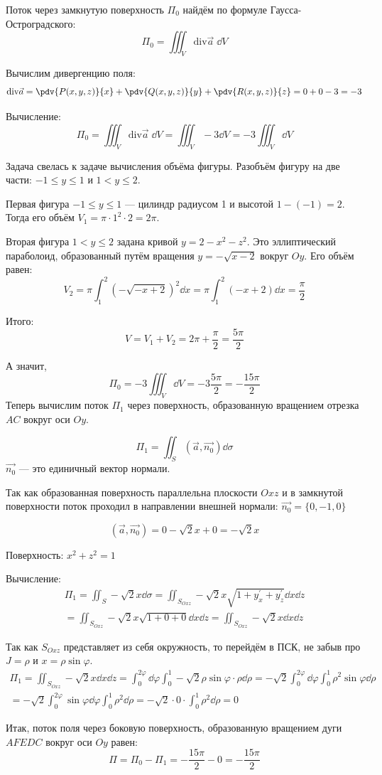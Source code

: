 Поток через замкнутую поверхность \(\Pi_0\)
найдём по формуле Гаусса-Остроградского:
\[ \Pi_{0} = \iiint_{V} \mathrm{div} \vec{a} \; \dd V \]

Вычислим дивергенцию поля:
\[
  \mathrm{div} \vec{a}
  = \pdv{P(x, y, z)}{x} + \pdv{Q(x, y, z)}{y} + \pdv{R(x, y, z)}{z}
  = 0 + 0 - 3 = -3
\]

Вычисление:
\[
  \Pi_0
  = \iiint_{V} \mathrm{div} \vec{a} \; \dd V
  = \iiint_{V} -3 \dd V
  = -3 \iiint_{V} \dd V
\]

Задача свелась к задаче вычисления объёма фигуры.
Разобъём фигуру на две части: \(-1 \leq y \leq 1\) и \(1 < y \leq 2\).

Первая фигура \(-1 \leq y \leq 1\) --- цилиндр радиусом 1
и высотой \(1 - (-1) = 2\).
Тогда его объём \(V_1 = \pi \cdot 1^2 \cdot 2 = 2 \pi\).

Вторая фигура \(1 < y \leq 2\) задана кривой
\(y = 2 - x^2 - z^2\).
Это эллиптический параболоид, образованный путём вращения
\(y = -\sqrt{x - 2}\) вокруг \(Oy\).
Его объём равен:
\[
  V_2 = \pi \int_{1}^{2} {\left(-\sqrt{-x + 2}\right)}^2 \dd x
  = \pi \int_{1}^{2} (-x + 2) \dd x
  = \frac{\pi}{2}
\]

Итого:
\[V = V_1 + V_2 = 2 \pi + \frac{\pi}{2} = \frac{5 \pi}{2}\]

А значит,
\[\Pi_0 = -3 \iiint_{V} \dd V = -3 \frac{5 \pi}{2} = -\frac{15 \pi}{2}\]
Теперь вычислим поток \(\Pi_{1}\) через поверхность,
образованную вращением отрезка \(AC\) вокруг оси \(Oy\).

\[
    \Pi_{1} = \iint_{S} (\vec{a}, \vec{n_{0}}) \dd \sigma
\]
\(\vec{n_0}\) --- это единичный вектор нормали.

Так как образованная поверхность параллельна плоскости \(Oxz\)
и в замкнутой поверхности поток проходил в направлении внешней нормали:
\(\Vec{n_{0}} = \{0,-1,0\}\)

\[(\vec{a}, \vec{n_{0}}) = 0 - \sqrt{2}x + 0 = -\sqrt{2}x\]

Поверхность: \(x^2 + z^2 = 1\)

Вычисление:
\[
\begin{split}
  \Pi_{1} = \iint_{S} -\sqrt{2}x \dd \sigma
    = \iint_{S_{Oxz}} -\sqrt{2}x
      \sqrt{1 + y_{x}^\prime + y_{z}^\prime} \dd x \dd z \\
    = \iint_{S_{Oxz}} -\sqrt{2}x \sqrt{1 + 0 + 0} \dd x \dd z
    = \iint_{S_{Oxz}} -\sqrt{2}x \dd x \dd z
\end{split}
\]

Так как \(S_{Oxz}\) представляет из себя окружность, то перейдём
в ПСК, не забыв про \(J = \rho\) и \(x = \rho \sin\varphi\).
\[
\begin{split}
  \Pi_1
  = \iint_{S_{Oxz}} -\sqrt{2}x \dd x \dd z
  = \int_{0}^{2\varphi} \dd \varphi
    \int_{0}^{1} -\sqrt{2} \rho \sin\varphi \cdot \rho \dd \rho
  = -\sqrt{2} \int_{0}^{2\varphi} \dd \varphi
     \int_{0}^{1} \rho^2 \sin\varphi \dd \rho \\
  = -\sqrt{2} \int_{0}^{2 \varphi} \sin\varphi \dd \varphi
    \int_{0}^{1} \rho^2 \dd \rho
  = -\sqrt{2} \cdot 0 \cdot \int_{0}^{1} \rho^2 \dd \rho
  = 0
\end{split}
\]

Итак, поток поля через боковую поверхность,
образованную вращением дуги \(AFEDC\) вокруг оси \(Oy\) равен:
\begin{equation*}
    \Pi = \Pi_{0} - \Pi_{1} = -\frac{15\pi}{2} - 0 = -\frac{15\pi}{2}
\end{equation*}
